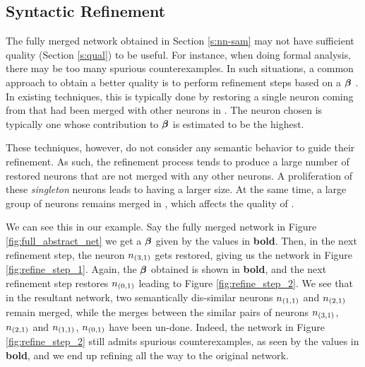 \subsection{ Syntactic Refinement }

The fully merged network obtained in Section \ref{s:nn-sam} may not have
sufficient quality (Section \ref{s:qual}) to be useful. For instance, when doing
formal analysis, there may be too many spurious counterexamples. In such
situations, a common approach to obtain a better quality \abs is to perform
refinement steps based on a \gencex $\boldsymbol{\beta}$
\cite{cegar-nn,cegarette,cleverest-nn}. In
existing techniques, this is typically done by restoring a single neuron coming
from \cnc that had been merged with other neurons in \abs. The neuron chosen is
typically one whose contribution to $\boldsymbol{\beta}$ is estimated to be the
highest.

These techniques, however, do not consider any semantic behavior to guide their
refinement. As such, the refinement process tends to produce a large number of
restored neurons that are not merged with any other neurons. A proliferation of
these \emph{singleton} neurons leads to \abs having a larger size. At the same time, 
a large group of neurons remains merged in \abs, which affects the quality of \abs. 

We can see this in our example. Say the fully merged network in Figure
\ref{fig:full_abstract_net} we get a $\boldsymbol{\beta}$ given by the values in \textbf{bold}.
Then, in the next refinement step, the neuron $n_{(3,1)}$ gets restored, giving
us the network in Figure \ref{fig:refine_step_1}. Again, the $\boldsymbol{\beta}$
obtained is shown in \textbf{bold}, and the next refinement step restores $n_{(0,1)}$
leading to Figure \ref{fig:refine_step_2}. We see that in the resultant network,
two semantically dis-similar neurons $n_{(1,1)}$ and $n_{(2,1)}$ remain merged,
while the merges between the similar pairs of neurons $n_{(3,1)}$, $n_{(2,1)}$
and $n_{(1,1)}$, $n_{(0,1)}$ have been un-done. Indeed, the network in Figure
\ref{fig:refine_step_2} still admits spurious counterexamples, as seen by the
values in \textbf{bold}, and we end up refining all the way to the original
network.



